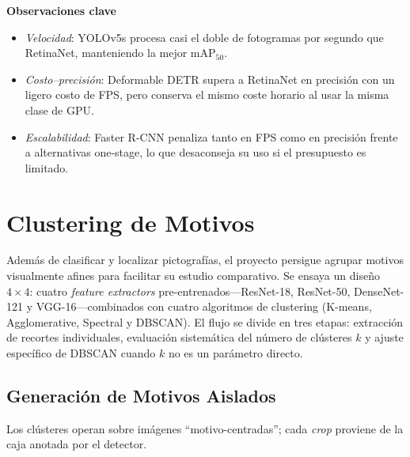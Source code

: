 \noindent
\textbf{Observaciones clave}

\begin{itemize}
  \item \emph{Velocidad}: YOLOv5s procesa casi el doble de fotogramas por segundo que RetinaNet, manteniendo la mejor \(\text{mAP}_{50}\).
  \item \emph{Costo–precisión}: Deformable DETR supera a RetinaNet en precisión con un ligero costo de FPS, pero conserva el mismo coste horario al usar la misma clase de GPU.
  \item \emph{Escalabilidad}: Faster R-CNN penaliza tanto en FPS como en precisión frente a alternativas one-stage, lo que desaconseja su uso si el presupuesto es limitado.
\end{itemize}

\section{Clustering de Motivos}\label{sec:clustering}

Además de clasificar y localizar pictografías, el proyecto persigue agrupar motivos visualmente afines para facilitar su estudio comparativo.
Se ensaya un diseño \(4\times4\): cuatro \emph{feature extractors} pre-entrenados—ResNet-18, ResNet-50, DenseNet-121 y VGG-16—combinados con cuatro algoritmos de clustering (K-means, Agglomerative, Spectral y DBSCAN).
El flujo se divide en tres etapas: extracción de recortes individuales, evaluación sistemática del número de clústeres \(k\) y ajuste específico de DBSCAN cuando \(k\) no es un parámetro directo.

\subsection{Generación de Motivos Aislados}\label{ssec:crop_motifs}

Los clústeres operan sobre imágenes “motivo-centradas”; cada \emph{crop} proviene de la caja anotada por el detector.

